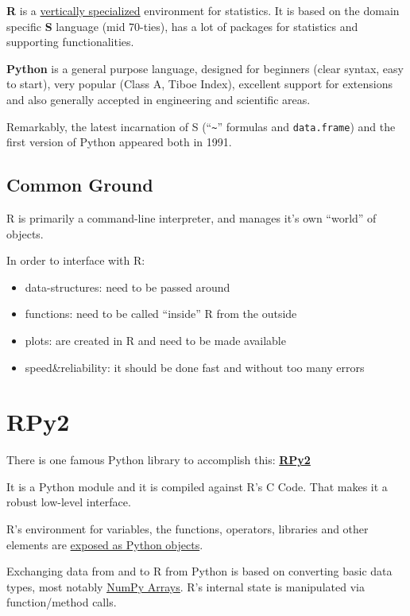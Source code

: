\documentclass[
paper=128mm:96mm, %
fontsize=11pt, %
pagesize, %
parskip=half-, %
]{scrartcl} %
\theoremstyle{mythmstyle} %
\def\shorttitle{R meets Python}
\newcommand*{\runninghead}{\shorttitle} %
\newcommand*{\newhead}[1]{\renewcommand*{\runninghead}{\shorttitle: #1}}
\begin{document}
\textbf{R} is a \uline{vertically specialized} environment for statistics.
It is based on the domain specific \textbf{S} language (mid 70-ties),
has a lot of packages for statistics and supporting functionalities.

\textbf{Python} is a general purpose language,
designed for beginners (clear syntax, easy to start),
very popular (Class A, Tiboe Index),
excellent support for extensions and
also generally accepted in engineering and scientific areas.

Remarkably, the latest incarnation of S
(``\texttt{\~}'' formulas and \texttt{data.frame})
and the first version of Python appeared both in 1991.

\clearpage


\newhead{Common Ground}
\subsection{Common Ground}

R is primarily a command-line interpreter,
and manages it's own ``world'' of objects.

In order to interface with R:
\begin{itemize}
\item{data-structures:} need to be passed around
\item{functions:} need to be called ``inside'' R from the outside
\item{plots:} are created in R and need to be made available
\item{speed\&reliability:} it should be done fast and without too many errors
\end{itemize}


\clearpage
\newhead{RPy2}
\section{RPy2}

There is one famous Python library to accomplish this:
\href{http://rpy.sourceforge.net/rpy2.html}{\textbf{RPy2}}

It is a Python module and it is compiled against R's C Code.
That makes it a robust low-level interface.

R's environment for variables, the functions, operators,
libraries and other elements are
\uline{exposed as Python objects}.

Exchanging data from and to R from Python is based on
converting basic data types,
most notably
\href{http://wiki.scipy.org/Tentative_NumPy_Tutorial}{\uline{NumPy Arrays}}.
R's internal state is manipulated via function/method calls.
\end{document}
